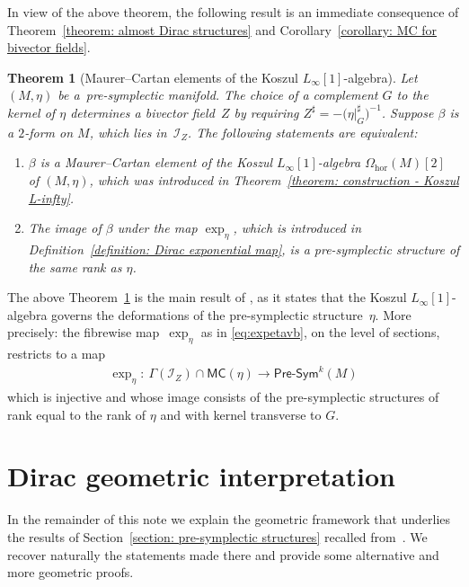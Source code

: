 \documentclass[pdftex]{sigma}
\numberwithin{equation}{section}
\newtheorem{Theorem}{Theorem}[section]
\newcommand{\Presym}{\mathsf{Pre}\textrm{-}\mathsf{Sym}}
\newcommand{\hor}{\mathrm{hor}}
\newcommand{\MC}{\mathsf{MC}}
\newcommand{\lione}{$L_{\infty}[1]$-algebra }
\begin{document}
In view of the above theorem, the following result \cite[Theorem~3.19]{SZPre} is an immediate consequence of Theorem~\ref{theorem: almost Dirac structures} and Corollary~\ref{corollary: MC for bivector fields}.

\begin{Theorem}[Maurer--Cartan elements of the Koszul {$L_\infty[1]$}-algebra] \label{theorem: main result} Let $(M,\eta)$ be a~pre-symplectic manifold. The choice of a complement $G$ to the kernel of $\eta$ determines a bivector field~$Z$ by requiring $Z^\sharp=-\big({\eta \vert_G^\sharp}\big)^{-1}$. Suppose $\beta$ is a $2$-form on $M$, which lies in~$\mathcal{I}_Z$. The following statements are equivalent:
\begin{enumerate}\itemsep=0pt
\item[$1.$] $\beta$ is a Maurer--Cartan element of the Koszul \lione $\Omega_\hor(M)[2]$ of $(M,\eta)$, which was introduced in Theorem~{\rm \ref{theorem: construction - Koszul L-infty}}.
\item[$2.$] The image of $\beta$ under the map $\exp_\eta$, which is introduced in Definition~{\rm \ref{definition: Dirac exponential map}}, is a pre-symplectic structure of the same rank as $\eta$.
\end{enumerate}
\end{Theorem}

The above Theorem~\ref{theorem: main result} is the main result of \cite{SZPre}, as it states that the Koszul $L_{\infty}[1]$-algebra governs the deformations of the pre-symplectic structure~$\eta$. More precisely: the fibrewise map~$\exp_\eta$ as in \eqref{eq:expetavb}, on the level of sections, restricts to a map
\begin{gather*}
\boxed{ \exp_\eta\colon \ \Gamma(\mathcal{I}_Z)\cap \MC(\eta) \to \Presym^k(M)}
\end{gather*}
which is injective and whose image consists of the pre-symplectic structures of rank equal to the rank of $\eta$ and with kernel transverse to $G$.

\section{Dirac geometric interpretation}\label{section: Dirac}

In the remainder of this note we explain the geometric framework that underlies the results of Section~\ref{section: pre-symplectic structures} recalled from~\cite{SZPre}. We recover naturally the statements made there and provide some alternative and more geometric proofs.
\end{document}
